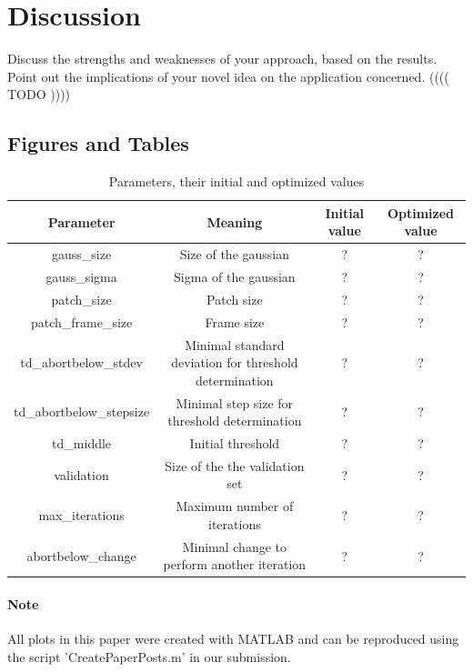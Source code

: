 \documentclass[10pt,conference,compsocconf]{IEEEtran}
\begin{document}
\section{Discussion}
  Discuss the strengths and weaknesses of your
  approach, based on the results. Point out the implications of your  
  novel idea on the application concerned. (((( TODO ))))


\subsection{Figures and Tables}

\begin{table}[p]
\begin{center}
\begin{tabular}{|c||c|c|c|}
\hline
Parameter & Meaning & Initial value & Optimized value\\
\hline\hline 
gauss\_size & Size of the gaussian & ? & ? \\
gauss\_sigma & Sigma of the gaussian & ? & ? \\
patch\_size & Patch size & ? & ? \\
patch\_frame\_size & Frame size & ? & ? \\
td\_abortbelow\_stdev & Minimal standard deviation for threshold determination& ? & ? \\
td\_abortbelow\_stepsize & Minimal step size for threshold determination & ? & ? \\
td\_middle &  Initial threshold & ? & ? \\
validation &  Size of the the validation set & ? & ? \\
max\_iterations & Maximum number of iterations & ? & ? \\
abortbelow\_change & Minimal change to perform another iteration & ? & ? \\

\hline
\end{tabular}
\end{center}
\caption{Parameters, their initial and optimized values}
\label{parameter_table}
\end{table}%


\paragraph{Note}
All plots in this paper were created with MATLAB and can be reproduced using the script 'CreatePaperPosts.m' in our submission.\\
\end{document}
